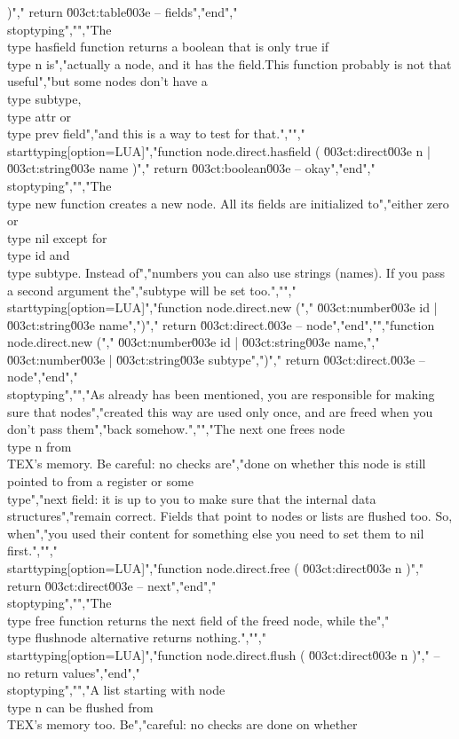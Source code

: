 )","    return \u003ct:table\u003e -- fields","end","\\stoptyping","","The \\type {hasfield} function returns a boolean that is only true if \\type {n} is","actually a node, and it has the field.This function probably is not that useful","but some nodes don't have a \\type {subtype}, \\type {attr} or \\type {prev} field","and this is a way to test for that.","","\\starttyping[option=LUA]","function node.direct.hasfield ( \u003ct:direct\u003e n | \u003ct:string\u003e name )","    return \u003ct:boolean\u003e -- okay","end","\\stoptyping","","The \\type {new} function creates a new node. All its fields are initialized to","either zero or \\type {nil} except for \\type {id} and \\type {subtype}. Instead of","numbers you can also use strings (names). If you pass a second argument the","subtype will be set too.","","\\starttyping[option=LUA]","function node.direct.new (","    \u003ct:number\u003e id | \u003ct:string\u003e name",")","    return \u003ct:direct.\u003e -- node","end","","function node.direct.new (","    \u003ct:number\u003e id | \u003ct:string\u003e name,","    \u003ct:number\u003e | \u003ct:string\u003e subtype",")","    return \u003ct:direct.\u003e -- node","end","\\stoptyping","","As already has been mentioned, you are responsible for making sure that nodes","created this way are used only once, and are freed when you don't pass them","back somehow.","","The next one frees node \\type {n} from \\TEX's memory. Be careful: no checks are","done on whether this node is still pointed to from a register or some \\type","{next} field: it is up to you to make sure that the internal data structures","remain correct. Fields that point to nodes or lists are flushed too. So, when","you used their content for something else you need to set them to nil first.","","\\starttyping[option=LUA]","function node.direct.free ( \u003ct:direct\u003e n )","    return \u003ct:direct\u003e -- next","end","\\stoptyping","","The \\type {free} function returns the next field of the freed node, while the","\\type {flushnode} alternative returns nothing.","","\\starttyping[option=LUA]","function node.direct.flush ( \u003ct:direct\u003e n )","    -- no return values","end","\\stoptyping","","A list starting with node \\type {n} can be flushed from \\TEX's memory too. Be","careful: no checks are done on whether 